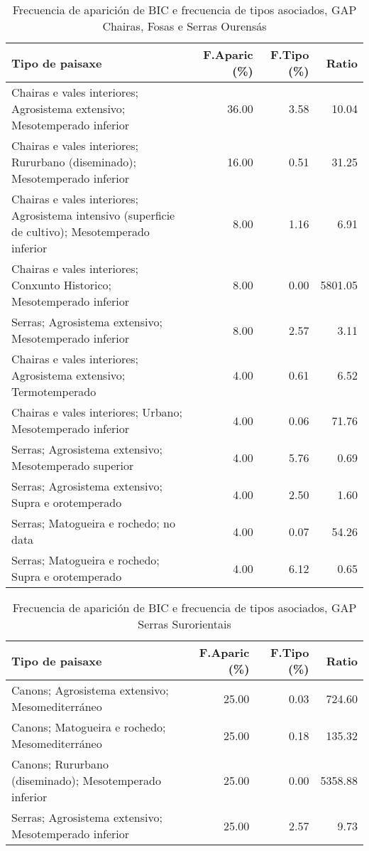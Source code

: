 \begin{table}[p]
\centering
\caption{Frecuencia de aparición de BIC e frecuencia de tipos asociados, GAP Chairas, Fosas e Serras Ourensás} 
\label{vbic8}
\begin{tabular}{lrrr}
  \hline
Tipo de paisaxe & F.Aparic (\%) & F.Tipo (\%) & Ratio \\ 
  \hline
Chairas e vales interiores; Agrosistema extensivo; Mesotemperado inferior & 36.00 & 3.58 & 10.04 \\ 
  Chairas e vales interiores; Rururbano (diseminado); Mesotemperado inferior & 16.00 & 0.51 & 31.25 \\ 
  Chairas e vales interiores; Agrosistema intensivo (superficie de cultivo); Mesotemperado inferior & 8.00 & 1.16 & 6.91 \\ 
  Chairas e vales interiores; Conxunto Historico; Mesotemperado inferior & 8.00 & 0.00 & 5801.05 \\ 
  Serras; Agrosistema extensivo; Mesotemperado inferior & 8.00 & 2.57 & 3.11 \\ 
  Chairas e vales interiores; Agrosistema extensivo; Termotemperado & 4.00 & 0.61 & 6.52 \\ 
  Chairas e vales interiores; Urbano; Mesotemperado inferior & 4.00 & 0.06 & 71.76 \\ 
  Serras; Agrosistema extensivo; Mesotemperado superior & 4.00 & 5.76 & 0.69 \\ 
  Serras; Agrosistema extensivo; Supra e orotemperado & 4.00 & 2.50 & 1.60 \\ 
  Serras; Matogueira e rochedo; no data & 4.00 & 0.07 & 54.26 \\ 
  Serras; Matogueira e rochedo; Supra e orotemperado & 4.00 & 6.12 & 0.65 \\ 
   \hline
\end{tabular}
\end{table}
\begin{table}[p]
\centering
\caption{Frecuencia de aparición de BIC e frecuencia de tipos asociados, GAP Serras Surorientais} 
\label{vbic9}
\begin{tabular}{lrrr}
  \hline
Tipo de paisaxe & F.Aparic (\%) & F.Tipo (\%) & Ratio \\ 
  \hline
Canons; Agrosistema extensivo; Mesomediterráneo & 25.00 & 0.03 & 724.60 \\ 
  Canons; Matogueira e rochedo; Mesomediterráneo & 25.00 & 0.18 & 135.32 \\ 
  Canons; Rururbano (diseminado); Mesotemperado inferior & 25.00 & 0.00 & 5358.88 \\ 
  Serras; Agrosistema extensivo; Mesotemperado inferior & 25.00 & 2.57 & 9.73 \\ 
   \hline
\end{tabular}
\end{table}
